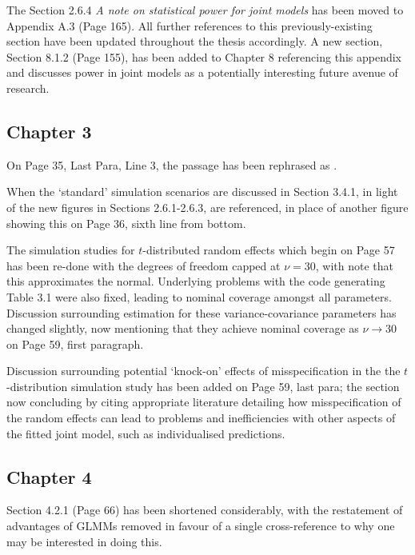 \documentclass{article}
\begin{document}
The Section 2.6.4 \textit{A note on statistical power for joint models} has been moved to Appendix A.3 (Page 165). All further references to this previously-existing section have been updated throughout the thesis accordingly. A new section, Section 8.1.2 (Page 155), has been added to Chapter 8 referencing this appendix and discusses power in joint models as a potentially interesting future avenue of research.

\subsection*{Chapter 3}
On Page 35, Last Para, Line 3, the passage  has been rephrased as .

When the `standard' simulation scenarios are discussed in Section 3.4.1, in light of the new figures in Sections 2.6.1-2.6.3,  are referenced, in place of another figure showing this on Page 36, sixth line from bottom. 

The simulation studies for $t$-distributed random effects which begin on Page 57 has been re-done with the degrees of freedom capped at $\nu=30$, with note that this approximates the normal. Underlying problems with the code generating Table 3.1 were also fixed, leading to nominal coverage amongst all parameters. Discussion surrounding estimation for these variance-covariance parameters has changed slightly, now mentioning that they achieve nominal coverage as $\nu\rightarrow30$ on Page 59, first paragraph.

Discussion surrounding potential `knock-on' effects of misspecification in the the $t$-distribution simulation study has been added on Page 59, last para; the section now concluding by citing appropriate literature detailing how misspecification of the random effects can lead to problems and inefficiencies with other aspects of the fitted joint model, such as individualised predictions.

\subsection*{Chapter 4}
Section 4.2.1 (Page 66) has been shortened considerably, with the restatement of advantages of GLMMs removed in favour of a single cross-reference to why one may be interested in doing this.
\end{document}
